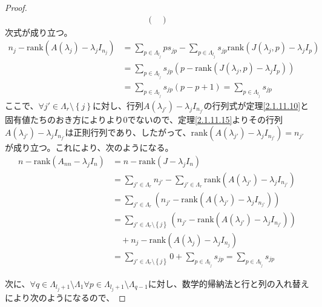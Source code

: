 \documentclass[dvipdfmx]{jsarticle}
\begin{document}
\begin{proof}
\begin{align*}
\begin{pmatrix}
\end{pmatrix}
\end{align*}
次式が成り立つ。
\begin{align*}
n_{j} - {\mathrm{rank}}\left( A\left( \lambda_{j} \right) - \lambda_{j}I_{n_{j}} \right) &= \sum_{p \in \varLambda_{l_{j}}} {ps_{jp}} - \sum_{p \in \varLambda_{l_{j}}} {s_{jp}{\mathrm{rank}}\left( J\left( \lambda_{j},p \right) - \lambda_{j}I_{p} \right)}\\
&= \sum_{p \in \varLambda_{l_{j}}} {s_{jp}\left( p - {\mathrm{rank}}\left( J\left( \lambda_{j},p \right) - \lambda_{j}I_{p} \right) \right)}\\
&= \sum_{p \in \varLambda_{l_{j}}} {s_{jp}(p - p + 1)} = \sum_{p \in \varLambda_{l_{j}}} s_{jp}
\end{align*}
ここで、$\forall j' \in \varLambda_{r} \setminus \left\{ j \right\}$に対し、行列$A\left( \lambda_{j'} \right) - \lambda_{j}I_{n_{j'}}$の行列式が定理\ref{2.1.11.10}と固有値たちのおき方によりより0でないので、定理\ref{2.1.11.15}よりその行列$A\left( \lambda_{j'} \right) - \lambda_{j}I_{n_{j'}}$は正則行列であり、したがって、${\mathrm{rank}}\left( A\left( \lambda_{j'} \right) - \lambda_{j}I_{n_{j'}} \right) = n_{j'}$が成り立つ。これにより、次のようになる。
\begin{align*}
n - {\mathrm{rank}}\left( A_{nn} - \lambda_{j}I_{n} \right) &= n - {\mathrm{rank}}\left( J - \lambda_{j}I_{n} \right)\\
&= \sum_{j' \in \varLambda_{r}} n_{j'} - \sum_{j' \in \varLambda_{r}} {{\mathrm{rank}}\left( A\left( \lambda_{j'} \right) - \lambda_{j}I_{n_{j'}} \right)}\\
&= \sum_{j' \in \varLambda_{r}} \left( n_{j'} - {\mathrm{rank}}\left( A\left( \lambda_{j'} \right) - \lambda_{j}I_{n_{j'}} \right) \right)\\
&= \sum_{j' \in \varLambda_{r} \setminus \left\{ j \right\}} \left( n_{j'} - {\mathrm{rank}}\left( A\left( \lambda_{j'} \right) - \lambda_{j}I_{n_{j'}} \right) \right) \\
&\quad + n_{j} - {\mathrm{rank}}\left( A\left( \lambda_{j} \right) - \lambda_{j}I_{n_{j}} \right)\\
&= \sum_{j' \in \varLambda_{r} \setminus \left\{ j \right\}} 0 + \sum_{p \in \varLambda_{l_{j}}} s_{jp} = \sum_{p \in \varLambda_{l_{j}}} s_{jp}
\end{align*}\par
次に、$\forall q \in \varLambda_{l_{j} + 1} \setminus \varLambda_{1}\forall p \in \varLambda_{l_{j} + 1} \setminus \varLambda_{q - 1}$に対し、数学的帰納法と行と列の入れ替えにより次のようになるので、

\end{proof}
\end{document}
